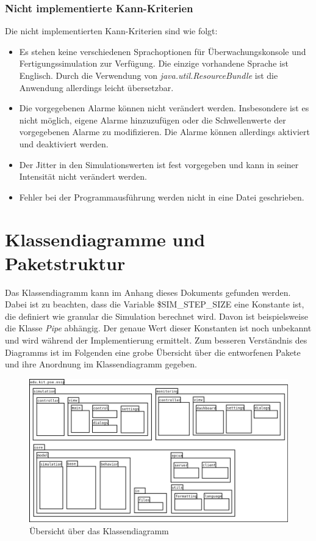\documentclass[parskip=full]{scrartcl}
\begin{document}
\subsubsection{Nicht implementierte Kann-Kriterien}
Die nicht implementierten Kann-Kriterien sind wie folgt:

\begin{itemize}
    \item Es stehen keine verschiedenen Sprachoptionen f\"ur \"Uberwachungskonsole und Fertigungssimulation zur Verf\"ugung.
    Die einzige vorhandene Sprache ist Englisch. Durch die Verwendung von \emph{java.util.ResourceBundle} ist die Anwendung allerdings leicht übersetzbar.
    \item Die vorgegebenen Alarme k\"onnen nicht ver\"andert werden. Insbesondere ist es nicht m\"oglich, eigene Alarme hinzuzuf\"ugen
    oder die Schwellenwerte der vorgegebenen Alarme zu modifizieren. Die Alarme können allerdings aktiviert und deaktiviert werden.
    \item Der Jitter in den Simulationswerten ist fest vorgegeben und kann in seiner Intensit\"at nicht ver\"andert werden.
    \item Fehler bei der Programmausf\"uhrung werden nicht in eine Datei geschrieben.
\end{itemize}

\section{Klassendiagramme und Paketstruktur}
Das Klassendiagramm kann im Anhang dieses Dokuments gefunden werden. Dabei ist zu beachten, dass die Variable \$SIM\_STEP\_SIZE eine Konstante ist,
die definiert wie granular die Simulation berechnet wird. Davon ist beispielsweise die Klasse \emph{Pipe} abhängig. Der genaue Wert dieser
Konstanten ist noch unbekannt und wird während der Implementierung ermittelt. Zum besseren Verständnis des Diagramms ist im Folgenden
eine grobe Übersicht über die entworfenen Pakete und ihre Anordnung im Klassendiagramm gegeben.

\begin{figure}[H]
  \centering
  \includegraphics[scale=0.45]{design/class-diagram-map.png}
  \caption{Übersicht über das Klassendiagramm}
\end{figure}
\end{document}
